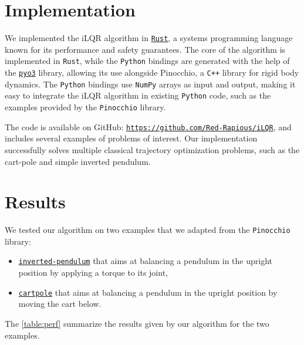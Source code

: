 \documentclass[nodate]{../cs-classes/cs-classes}
\begin{document}
\section{Implementation}
We implemented the iLQR algorithm in \href{https://www.rust-lang.org/}{\texttt{Rust}}, a systems programming language known for its performance and safety guarantees. The core of the algorithm is implemented in \texttt{Rust}, while the \texttt{Python} bindings are generated with the help of the \href{https://pyo3.rs/v0.23.3/}{\texttt{pyo3}} library, allowing its use alongside Pinocchio, a \texttt{C++} library for rigid body dynamics. The \texttt{Python} bindings use \texttt{NumPy} arrays as input and output, making it easy to integrate the iLQR algorithm in existing \texttt{Python} code, such as the examples provided by the \texttt{Pinocchio} library.

The code is available on GitHub: \href{https://github.com/Red-Rapious/iLQR}{\texttt{https://github.com/Red-Rapious/iLQR}}, and includes several examples of problems of interest. Our implementation successfully solves multiple classical trajectory optimization problems, such as the cart-pole and simple inverted pendulum.

\section{Results}

We tested our algorithm on two examples that we adapted from the \texttt{Pinocchio} library:
\begin{itemize}
    \item \href{https://github.com/stack-of-tasks/pinocchio/blob/master/examples/simulation-inverted-pendulum.py}{\texttt{inverted-pendulum}} that aims at balancing a pendulum in the upright position by applying a torque to its joint,
    \item \href{https://github.com/stack-of-tasks/pinocchio/blob/master/examples/simulation-pendulum.py}{\texttt{cartpole}} that aims at balancing a pendulum in the upright position by moving the cart below.
\end{itemize}
The \autoref{table:perf} summarize the results given by our algorithm for the two examples.
\end{document}
